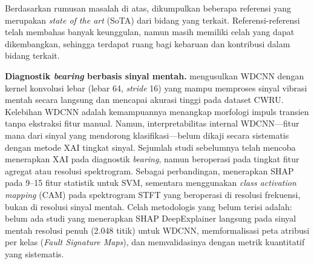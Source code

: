 

Berdasarkan rumusan masalah di atas, dikumpulkan beberapa referensi
yang merupakan \emph{state of the art} (SoTA) dari bidang yang terkait.
Referensi-referensi telah membahas banyak keunggulan, 
namun masih memiliki celah yang dapat dikembangkan, sehingga terdapat
ruang bagi kebaruan dan kontribusi dalam bidang terkait.

\textbf{Diagnostik \emph{bearing} berbasis sinyal mentah.}
 mengusulkan WDCNN dengan kernel
konvolusi lebar (lebar 64, \emph{stride} 16) yang mampu memproses sinyal
vibrasi mentah secara langsung dan mencapai akurasi tinggi pada dataset
CWRU.
Kelebihan WDCNN adalah kemampuannya menangkap morfologi impuls transien
tanpa ekstraksi fitur manual.
Namun, interpretabilitas internal WDCNN---fitur mana dari sinyal yang
mendorong klasifikasi---belum dikaji secara sistematis dengan metode XAI
tingkat sinyal.
{\color{blue}Sejumlah studi sebelumnya telah mencoba menerapkan XAI pada
diagnostik \emph{bearing}, namun beroperasi pada tingkat fitur agregat
atau resolusi spektrogram.}
Sebagai perbandingan, {\color{blue}
menerapkan SHAP pada 9--15 fitur statistik untuk SVM,
sementara  menggunakan
\emph{class activation mapping} (CAM) pada spektrogram STFT yang
beroperasi di resolusi frekuensi, bukan di resolusi sinyal mentah.}
Celah metodologis yang belum terisi adalah: belum ada studi yang menerapkan
SHAP DeepExplainer langsung pada sinyal mentah resolusi penuh (2.048 titik)
untuk WDCNN, memformalisasi peta atribusi per kelas (\emph{Fault Signature
Maps}), dan memvalidasinya dengan metrik kuantitatif yang sistematis.

